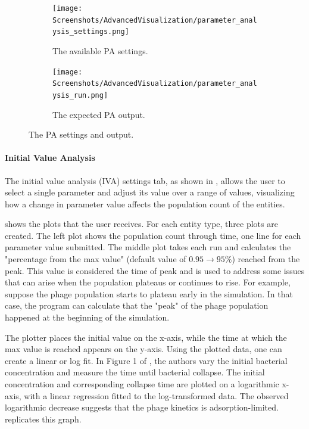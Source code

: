\begin{figure}[h!]
    \centering
    \begin{subfigure}{0.49\linewidth}
        \centering
        \captionsetup{width=1\linewidth}
        \texttt{[image: Screenshots/AdvancedVisualization/parameter\_analysis\_settings.png]}
        \caption{
            The available PA settings. 
        }
        \label{fig:ss:av:parameter_analysis_settings}
    \end{subfigure}
    \hfill
    \begin{subfigure}{0.49\linewidth}
        \centering
        \captionsetup{width=1\linewidth}
        \texttt{[image: Screenshots/AdvancedVisualization/parameter\_analysis\_run.png]}
        \caption{
            The expected PA output. 
        }
        \label{fig:ss:av:parameter_analysis_run}
    \end{subfigure}
    \caption{The PA settings and output.}
\end{figure}

\paragraph{Initial Value Analysis}
\label{sec:initial_value_analysis}
The initial value analysis (IVA) settings tab, as shown in , allows the user to select a single parameter and adjust its value over a range of values, visualizing how a change in parameter value affects the population count of the entities.

 shows the plots that the user receives.
For each entity type, three plots are created.
The left plot shows the population count through time, one line for each parameter value submitted.
The middle plot takes each run and calculates the "percentage from the max value" (default value of $0.95 \rightarrow 95\%$) reached from the peak.
This value is considered the time of peak and is used to address some issues that can arise when the population plateaus or continues to rise.
For example, suppose the phage population starts to plateau early in the simulation. 
In that case, the program can calculate that the "peak" of the phage population happened at the beginning of the simulation. 

The plotter places the initial value on the x-axis, while the time at which the max value is reached appears on the y-axis. 
Using the plotted data, one can create a linear or log fit.
In Figure 1 of \citet{mullaExtremeDiversityPhage2024}, the authors vary the initial bacterial concentration and measure the time until bacterial collapse. 
The initial concentration and corresponding collapse time are plotted on a logarithmic x-axis, with a linear regression fitted to the log-transformed data.
The observed logarithmic decrease suggests that the phage kinetics is adsorption-limited. 
 replicates this graph. 


